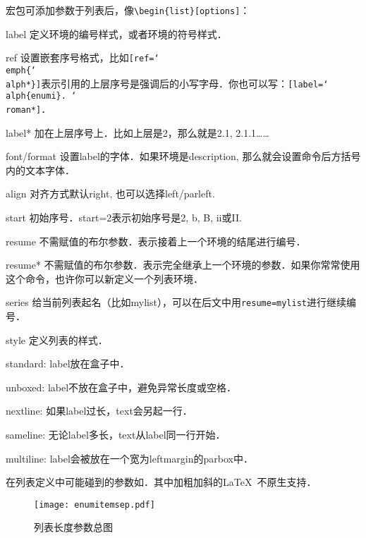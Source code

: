 宏包可添加参数于列表后，像\verb|\begin{list}[options]|：
\begin{para}
\item[label] 定义环境的编号样式，或者环境的符号样式．
\item[ref] 设置嵌套序号格式，比如\texttt{[ref=\char`\\emph\{\char`\\alph*\}]}表示引用的上层序号是强调后的小写字母．你也可以写：\texttt{[label=\char`\\alph\{enumi\}.\ \char`\\roman*]}．
\item[label*] 加在上层序号上．比如上层是2，那么就是2.1, 2.1.1……
\item[font/format] 设置label的字体．如果环境是description, 那么就会设置命令后方括号内的文本字体．
\item[align] 对齐方式默认right, 也可以选择left/parleft.
\item[start] 初始序号．start=2表示初始序号是2, b, B, ii或II.
\item[resume] 不需赋值的布尔参数．表示接着上一个环境的结尾进行编号．
\item[resume*] 不需赋值的布尔参数．表示完全继承上一个环境的参数．如果你常常使用这个命令，也许你可以新定义一个列表环境．
\item[series] 给当前列表起名（比如mylist），可以在后文中用\texttt{resume=mylist}进行继续编号．
\item[style] 定义列表的样式．
\begin{para}
\item[standard:] label放在盒子中．
\item[unboxed:] label不放在盒子中，避免异常长度或空格．
\item[nextline:] 如果label过长，text会另起一行．
\item[sameline:] 无论label多长，text从label同一行开始．
\item[multiline:] label会被放在一个宽为leftmargin的parbox中．
\end{para}
\end{para}

在列表定义中可能碰到的参数如．其中加粗加斜的\LaTeX\ 不原生支持．
\begin{figure}[!hbt]
\texttt{[image: enumitemsep.pdf]}
\caption{列表长度参数总图}
\label{fig:enumitemsep}
\end{figure}

